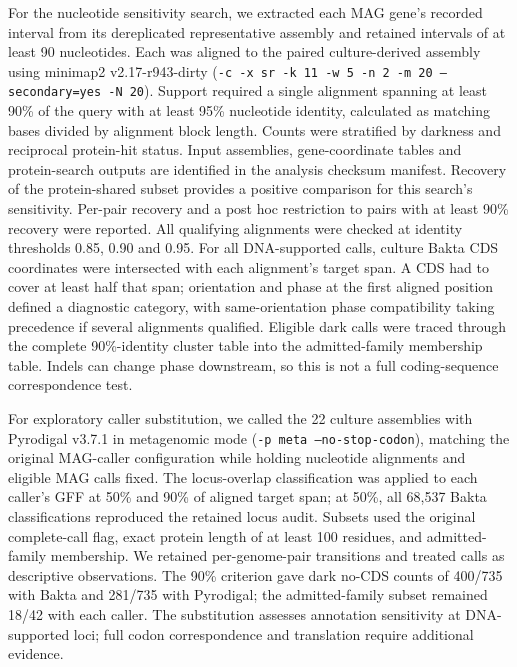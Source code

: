 \documentclass[11pt]{article}
\begin{document}
For the nucleotide sensitivity search, we extracted each MAG gene's recorded interval from its
dereplicated representative assembly and retained intervals of at least 90 nucleotides. Each was
aligned to the paired culture-derived assembly using minimap2 v2.17-r943-dirty
(\texttt{-c -x sr -k 11 -w 5 -n 2 -m 20 --secondary=yes -N 20}). Support required a single
alignment spanning at least 90\% of the query with at least 95\% nucleotide identity, calculated
as matching bases divided by alignment block length. Counts were stratified by darkness and
reciprocal protein-hit status. Input assemblies, gene-coordinate tables and protein-search outputs
are identified in the analysis checksum manifest. Recovery of the protein-shared subset provides
a positive comparison for this search's sensitivity. Per-pair recovery and a post hoc restriction to pairs with at least
90\% recovery were reported. All qualifying alignments were checked at identity thresholds
0.85, 0.90 and 0.95. For all DNA-supported calls, culture Bakta CDS coordinates were
intersected with each alignment's target span. A CDS had to cover at least half that span;
orientation and phase at the first aligned position defined a diagnostic category, with
same-orientation phase compatibility taking precedence if several alignments qualified. Eligible dark calls were traced through the complete 90\%-identity cluster table into the admitted-family membership table. Indels
can change phase downstream, so this is not a full coding-sequence correspondence test.

For exploratory caller substitution, we called the 22 culture assemblies with Pyrodigal v3.7.1 in metagenomic mode (\texttt{-p meta --no-stop-codon}), matching the original MAG-caller configuration while holding nucleotide alignments and eligible MAG calls fixed. The locus-overlap classification was applied to each caller's GFF at 50\% and 90\% of aligned target span; at 50\%, all 68{,}537 Bakta classifications reproduced the retained locus audit. Subsets used the original complete-call flag, exact protein length of at least 100 residues, and admitted-family membership. We retained per-genome-pair transitions and treated calls as descriptive observations. The 90\% criterion gave dark no-CDS counts of 400/735 with Bakta and 281/735 with Pyrodigal; the admitted-family subset remained 18/42 with each caller. The substitution assesses annotation sensitivity at DNA-supported loci; full codon correspondence and translation require additional evidence.
\end{document}
